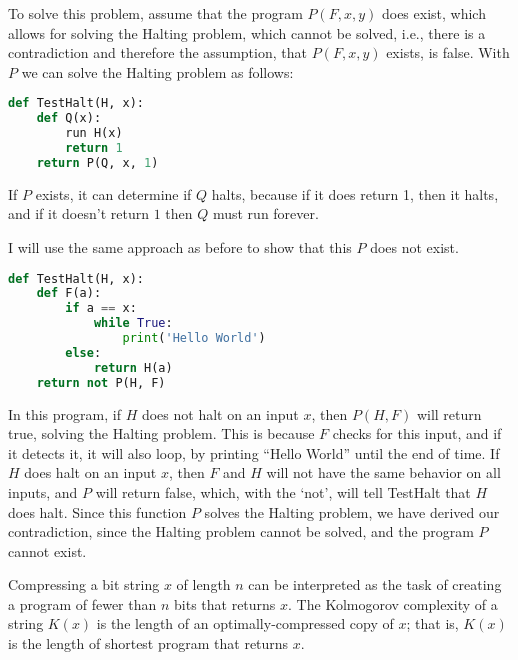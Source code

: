 \documentclass[11pt]{article}
\begin{document}
\begin{solution}

\begin{Parts}
\Part To solve this problem, assume that the program $P(F,x,y)$ does exist, which allows
for solving the Halting problem, which cannot be solved, i.e., there is a contradiction and
therefore the assumption, that $P(F,x,y)$ exists, is false. With $P$ we can solve the Halting
problem as follows:

\begin{lstlisting}[language=Python]
def TestHalt(H, x):
    def Q(x):
        run H(x)
        return 1
    return P(Q, x, 1)
\end{lstlisting}

If $P$ exists, it can determine if $Q$ halts, because if it does return 1, then it halts, and
if it doesn't return $1$ then $Q$ must run forever. 

\Part I will use the same approach as before to show that this $P$ does not exist. 

\begin{lstlisting}[language=Python]
def TestHalt(H, x):
    def F(a):
        if a == x:
            while True:
                print('Hello World')
        else:
            return H(a)
    return not P(H, F)
\end{lstlisting}

In this program, if $H$ does not halt on an input $x$, then $P(H, F)$ will return true, solving
the Halting problem. This is because $F$ checks for this input, and if it detects it, it will
also loop, by printing ``Hello World'' until the end of time. If $H$ does halt on an input $x$,
then $F$ and $H$ will not have the same behavior on all inputs, and $P$ will return false, which,
with the `not', will tell TestHalt that $H$ does halt. Since this function $P$ solves the Halting
problem, we have derived our contradiction, since the Halting problem cannot be solved, and the
program $P$ cannot exist. 

\end{Parts}

\end{solution}


Compressing a bit string $x$ of length $n$ can be interpreted as the task of creating a program of fewer than $n$ bits that returns $x$.
The Kolmogorov complexity of a string $K(x)$ is the length of an optimally-compressed copy of $x$; that is, $K(x)$ is the length of shortest program that returns $x$.
\end{document}
